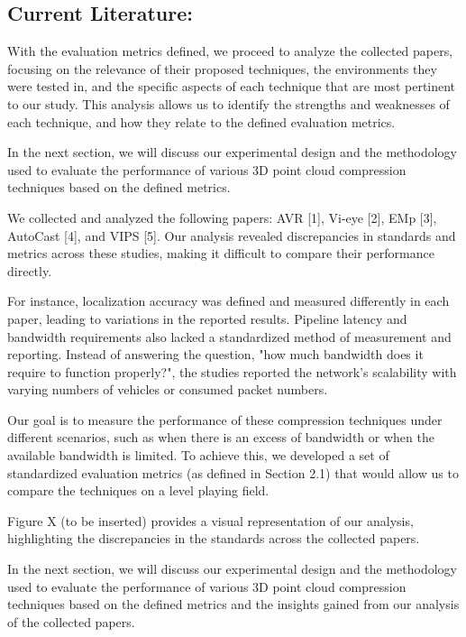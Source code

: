\documentclass[conference]{IEEEtran}
\begin{document}
\subsection{Current Literature:}

With the evaluation metrics defined, we proceed to analyze the collected papers, focusing on the relevance of their proposed techniques, the environments they were tested in, and the specific aspects of each technique that are most pertinent to our study. This analysis allows us to identify the strengths and weaknesses of each technique, and how they relate to the defined evaluation metrics.

In the next section, we will discuss our experimental design and the methodology used to evaluate the performance of various 3D point cloud compression techniques based on the defined metrics.


We collected and analyzed the following papers: AVR [1], Vi-eye [2], EMp [3], AutoCast [4], and VIPS [5]. Our analysis revealed discrepancies in standards and metrics across these studies, making it difficult to compare their performance directly.

For instance, localization accuracy was defined and measured differently in each paper, leading to variations in the reported results. Pipeline latency and bandwidth requirements also lacked a standardized method of measurement and reporting. Instead of answering the question, "how much bandwidth does it require to function properly?", the studies reported the network's scalability with varying numbers of vehicles or consumed packet numbers.

Our goal is to measure the performance of these compression techniques under different scenarios, such as when there is an excess of bandwidth or when the available bandwidth is limited. To achieve this, we developed a set of standardized evaluation metrics (as defined in Section 2.1) that would allow us to compare the techniques on a level playing field.

Figure X (to be inserted) provides a visual representation of our analysis, highlighting the discrepancies in the standards across the collected papers.

In the next section, we will discuss our experimental design and the methodology used to evaluate the performance of various 3D point cloud compression techniques based on the defined metrics and the insights gained from our analysis of the collected papers.

\end{document}
